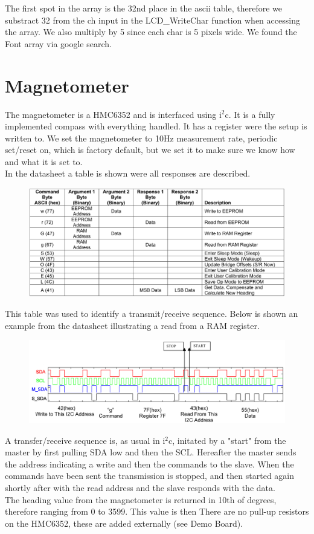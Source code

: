 The first spot in the array is the 32nd place in the ascii table, therefore we substract 32 from the ch input in the LCD\_WriteChar function when accessing the array. We also multiply by 5 since each char is 5 pixels wide. We found the Font array via google search.

\section{Magnetometer}
The magnetometer is a HMC6352 and is interfaced using i$^2$c. It is a fully implemented compass with everything handled. It has a register were the setup is written to. We set the magnetometer to 10Hz measurement rate, periodic set/reset on, which is factory default, but we set it to make sure we know how and what it is set to.\\
In the datasheet a table is shown were all responses are described.

\begin{figure}[H]
\centering
\includegraphics[width=.9\textwidth]{billeder/HMC6352_responses}
\end{figure}

This table was used to identify a transmit/receive sequence. Below is shown an example from the datasheet illustrating a read from a RAM register.

\begin{figure}[H]
\centering
\includegraphics[width=.8\textwidth]{billeder/HMC6352_example}
\end{figure}

A transfer/receive sequence is, as usual in i$^2$c, initated by a "start" from the master by first pulling SDA low and then the SCL. Hereafter the master sends the address indicating a write and then the commands to the slave. When the commands have been sent the transmission is stopped, and then started again shortly after with the read address and the slave responds with the data.\\
The heading value from the magnetometer is returned in 10th of degrees, therefore ranging from 0 to 3599. This value is then
There are no pull-up resistors on the HMC6352, these are added externally (see Demo Board).\\

